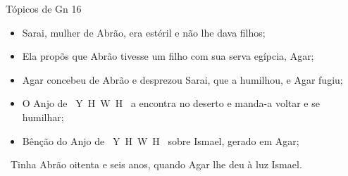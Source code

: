 \documentclass[12pt,aspectratio=169]{beamer}
\newcommand{\YA}{%
    \mbox{%
        Y\makebox[0pt][l]{\hspace{-0.178em}\raisebox{-0.00ex}{\scalebox{0.30}{E}}}%
        H\makebox[0pt][l]{\hspace{-0.010em}\raisebox{-0.00ex}{\scalebox{0.30}{O}}}%
        W\makebox[0pt][l]{\hspace{-0.245em}\raisebox{-0.00ex}{\scalebox{0.30}{A}}}%
        H%
    }%
}
\newcommand{\ver}[1]{%
    \raisebox{0.50ex}{%
        \scalebox{1.1}{%
            \pmb{\textbf{\textcolor{BSpbg}{#1}}}%
        }%
    }%
}
\newcommand{\QUOTE}[1]{%
    \par\noindent\hspace*{0.05\linewidth}%
    \begin{minipage}{0.9\linewidth}%
        \linespread{1.35}\large{#1}%
    \end{minipage}%
}
\newcommand{\YEL}[1]{{\textcolor{TXyel}{#1}}}
\newcommand{\BRI}[1]{{\textcolor{BSpbg}{#1}}}   %
\begin{document}
    \begin{frame}{\YEL{Tópicos de Gn 16}}
        \begin{itemize}
            \item Sarai, mulher de Abrão, era estéril e não lhe dava filhos;
            \item Ela propõs que Abrão tivesse um filho com sua serva egípcia, Agar;
            \item Agar concebeu de Abrão e desprezou Sarai, que a humilhou, e Agar fugiu;
            \item O \BRI{Anjo de \YA} a encontra no deserto e manda-a voltar e se humilhar;
            \item Bênção do \BRI{Anjo de \YA} sobre Ismael, gerado em Agar;
        \end{itemize}

        \vspace{1.5\bigskipamount}

        \QUOTE{
            \ver{16}~Tinha Abrão \YEL{oitenta e seis anos}, quando Agar lhe deu à luz Ismael.
        }
    \end{frame}
\end{document}
